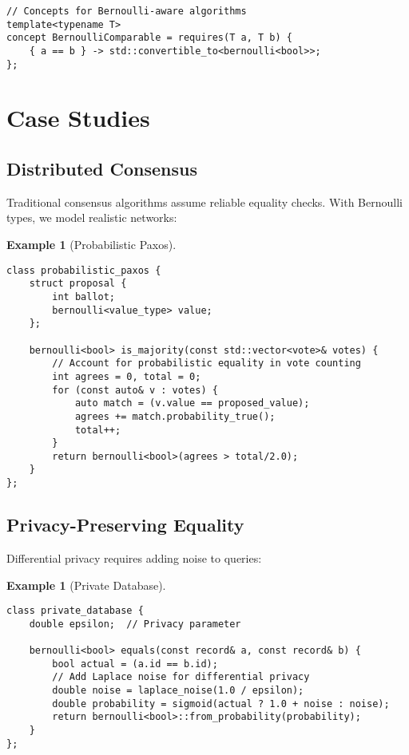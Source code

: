 \documentclass[11pt,final,hidelinks]{article}
\newtheorem{example}[theorem]{Example}
\begin{document}
{\begin{verbatim}
// Concepts for Bernoulli-aware algorithms
template<typename T>
concept BernoulliComparable = requires(T a, T b) {
    { a == b } -> std::convertible_to<bernoulli<bool>>;
};
\end{verbatim}

\section{Case Studies}

\subsection{Distributed Consensus}

Traditional consensus algorithms assume reliable equality checks. With Bernoulli types, we model realistic networks:

\begin{example}[Probabilistic Paxos]
\begin{verbatim}
class probabilistic_paxos {
    struct proposal {
        int ballot;
        bernoulli<value_type> value;
    };
    
    bernoulli<bool> is_majority(const std::vector<vote>& votes) {
        // Account for probabilistic equality in vote counting
        int agrees = 0, total = 0;
        for (const auto& v : votes) {
            auto match = (v.value == proposed_value);
            agrees += match.probability_true();
            total++;
        }
        return bernoulli<bool>(agrees > total/2.0);
    }
};
\end{verbatim}
\end{example}

\subsection{Privacy-Preserving Equality}

Differential privacy requires adding noise to queries:

\begin{example}[Private Database]
\begin{verbatim}
class private_database {
    double epsilon;  // Privacy parameter
    
    bernoulli<bool> equals(const record& a, const record& b) {
        bool actual = (a.id == b.id);
        // Add Laplace noise for differential privacy
        double noise = laplace_noise(1.0 / epsilon);
        double probability = sigmoid(actual ? 1.0 + noise : noise);
        return bernoulli<bool>::from_probability(probability);
    }
};
\end{verbatim}
\end{example}

}
\end{document}
